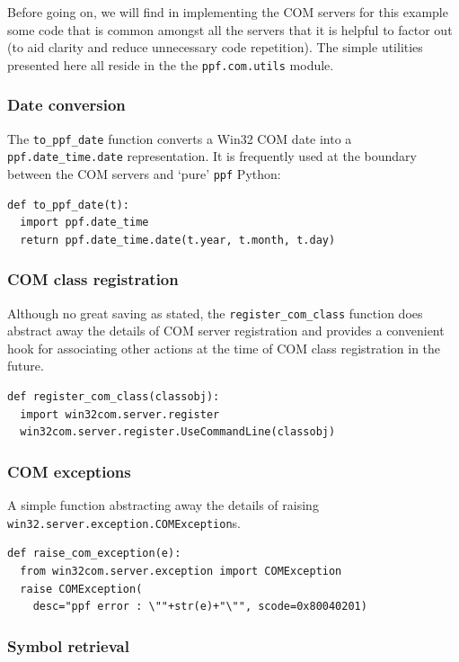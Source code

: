 Before going on, we will find in implementing the COM servers for this
example some code that is common amongst all the servers that it is
helpful to factor out (to aid clarity and reduce unnecessary code
repetition). The simple utilities presented here all reside in the the
\verb|ppf.com.utils| module.

\subsubsection{Date conversion}

The \verb|to_ppf_date| function converts a Win32 COM date into a
\verb|ppf.date_time.date| representation. It is frequently used at the
boundary between the COM servers and `pure' \verb|ppf| Python:
\begin{verbatim}
def to_ppf_date(t):
  import ppf.date_time
  return ppf.date_time.date(t.year, t.month, t.day)
\end{verbatim}

\subsubsection{COM class registration}

Although no great saving as stated, the \verb|register_com_class|
function does abstract away the details of COM server registration and
provides a convenient hook for associating other actions at the time
of COM class registration in the future.
\begin{verbatim}
def register_com_class(classobj):
  import win32com.server.register
  win32com.server.register.UseCommandLine(classobj)
\end{verbatim}

\subsubsection{COM exceptions}

A simple function abstracting away the details of raising \\
\verb|win32.server.exception.COMException|s.
\begin{verbatim}
def raise_com_exception(e):
  from win32com.server.exception import COMException
  raise COMException(
    desc="ppf error : \""+str(e)+"\"", scode=0x80040201)
\end{verbatim}

\subsubsection{Symbol retrieval}

